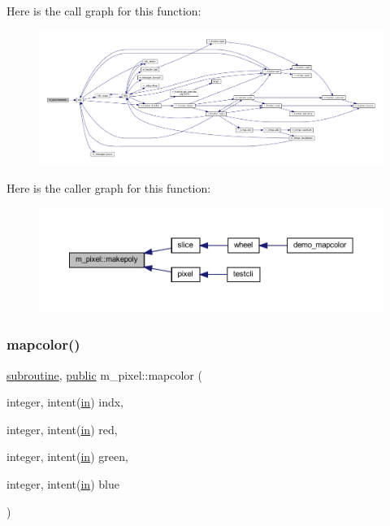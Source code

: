 Here is the call graph for this function\+:
\nopagebreak
\begin{figure}[H]
\begin{center}
\leavevmode
\includegraphics[width=350pt]{namespacem__pixel_ab7128437f95b40004bf73fc6e3f597f8_cgraph}
\end{center}
\end{figure}
Here is the caller graph for this function\+:
\nopagebreak
\begin{figure}[H]
\begin{center}
\leavevmode
\includegraphics[width=350pt]{namespacem__pixel_ab7128437f95b40004bf73fc6e3f597f8_icgraph}
\end{center}
\end{figure}
\mbox{\label{namespacem__pixel_a3422f51171f30979868a8075690da9f5}} 
\subsubsection{\texorpdfstring{mapcolor()}{mapcolor()}}
{\footnotesize\ttfamily \hyperlink{M__stopwatch_83_8txt_acfbcff50169d691ff02d4a123ed70482}{subroutine}, \hyperlink{M__stopwatch_83_8txt_a2f74811300c361e53b430611a7d1769f}{public} m\+\_\+pixel\+::mapcolor (\begin{DoxyParamCaption}\item[{integer, intent(\hyperlink{M__journal_83_8txt_afce72651d1eed785a2132bee863b2f38}{in})}]{indx,  }\item[{integer, intent(\hyperlink{M__journal_83_8txt_afce72651d1eed785a2132bee863b2f38}{in})}]{red,  }\item[{integer, intent(\hyperlink{M__journal_83_8txt_afce72651d1eed785a2132bee863b2f38}{in})}]{green,  }\item[{integer, intent(\hyperlink{M__journal_83_8txt_afce72651d1eed785a2132bee863b2f38}{in})}]{blue }\end{DoxyParamCaption})}



